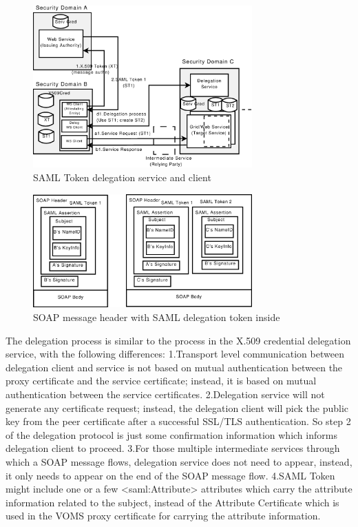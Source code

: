\begin{figure}
\includegraphics[width=0.75\textwidth]{SAMLDelegation.eps}
\caption{SAML Token delegation service and client}
\label{fig:SAMLDelegation}
\end{figure}

\begin{figure}
\includegraphics[width=0.75\textwidth]{SAMLDelegationMessage.eps}
\caption{SOAP message header with SAML delegation token inside}
\label{fig:SAMLDelegationMessage}
\end{figure}
The delegation process is similar to the process in the X.509 credential delegation service, with the following differences:
1.Transport level communication between delegation client and service is not based on mutual authentication between the proxy certificate and the service certificate; instead, it is based on mutual authentication between the service certificates.
2.Delegation service will not generate any certificate request; instead, the delegation client will pick the public key from the peer certificate after a successful SSL/TLS authentication. So step 2 of the delegation protocol is just some confirmation information which informs delegation client to proceed.
3.For those multiple intermediate services through which a SOAP message flows, delegation service does not need to appear, instead, it only needs to appear on the end of the SOAP message flow.
4.SAML Token might include one or a few <saml:Attribute> attributes which carry the attribute information related to the subject, instead of the Attribute Certificate which is used in the VOMS proxy certificate for carrying the attribute information.

